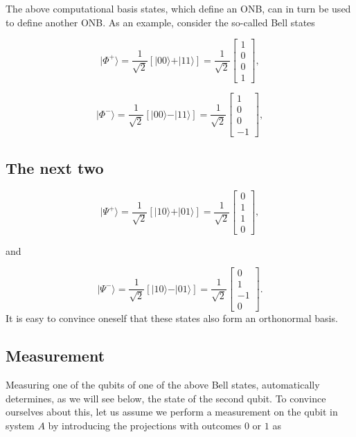 The above computational basis states, which define an ONB, can in turn
be used to define another ONB. As an example, consider the so-called
Bell states

\[
\vert \Phi^+\rangle = \frac{1}{\sqrt{2}}\left[\vert 00\rangle +\vert 11\rangle\right]=\frac{1}{\sqrt{2}}\begin{bmatrix} 1 \\ 0 \\ 0 \\ 1\end{bmatrix},
\]

\[
\vert \Phi^-\rangle = \frac{1}{\sqrt{2}}\left[\vert 00\rangle -\vert 11\rangle\right]=\frac{1}{\sqrt{2}}\begin{bmatrix} 1 \\ 0 \\ 0 \\ -1\end{bmatrix},
\]

\subsection{The next two}

\[
\vert \Psi^+\rangle = \frac{1}{\sqrt{2}}\left[\vert 10\rangle +\vert 01\rangle\right]=\frac{1}{\sqrt{2}}\begin{bmatrix} 0 \\ 1 \\ 1 \\ 0\end{bmatrix},
\]

and

\[
\vert \Psi^-\rangle = \frac{1}{\sqrt{2}}\left[\vert 10\rangle -\vert 01\rangle\right]=\frac{1}{\sqrt{2}}\begin{bmatrix} 0 \\ 1 \\ -1 \\ 0\end{bmatrix}.
\]
It is easy to convince oneself that these states also form an orthonormal basis. 

\subsection{Measurement}

Measuring one of the qubits of one of the above Bell states,
automatically determines, as we will see below, the state of the
second qubit. To convince ourselves about this, let us assume we perform a measurement on the qubit in system $A$ by introducing the projections with outcomes $0$ or $1$ as

